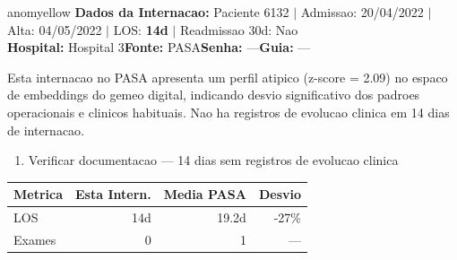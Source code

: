 \documentclass[a4paper,10pt]{article}
\begin{document}
\begin{anomalycard}[Internacao 67103 | PASA | MODERADO (z=2.09)]{anomyellow}
\textbf{Dados da Internacao:} Paciente 6132 $\mid$ Admissao: 20/04/2022 $\mid$ Alta: 04/05/2022 $\mid$ LOS: \textbf{14d} $\mid$ Readmissao 30d: Nao\\
\textbf{Hospital:} Hospital 3\quad\textbf{Fonte:} PASA\quad\textbf{Senha:} ---\quad\textbf{Guia:} ---\\
\vspace{2pt}\begin{tcolorbox}[colback=severityred!20,colframe=anomyellow,title={\textbf{Interpretacao de Negocio}},fonttitle=\bfseries\small,left=4pt,right=4pt,top=3pt,bottom=3pt]
{\small Esta internacao no PASA apresenta um perfil atipico (z-score = 2.09) no espaco de embeddings do gemeo digital, indicando desvio significativo dos padroes operacionais e clinicos habituais. Nao ha registros de evolucao clinica em 14 dias de internacao.}
\end{tcolorbox}
\begin{tcolorbox}[colback=severityyellow!30,colframe=anomorange,title={\textbf{Recomendacoes Especificas}},fonttitle=\bfseries\small,left=4pt,right=4pt,top=3pt,bottom=3pt]
\begin{enumerate}[nosep,leftmargin=16pt]
\item {\small Verificar documentacao --- 14 dias sem registros de evolucao clinica}
\end{enumerate}
\end{tcolorbox}
\begin{center}\begin{tabular}{l r r r}\toprule\textbf{Metrica} & \textbf{Esta Intern.} & \textbf{Media PASA} & \textbf{Desvio} \\\midrule
LOS & 14d & 19.2d & -27\% \\
Exames & 0 & 1 & --- \\
\bottomrule\end{tabular}\end{center}


\end{anomalycard}
\end{document}
